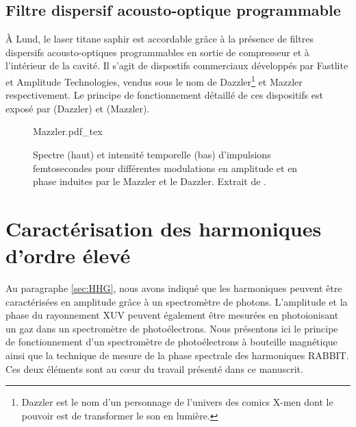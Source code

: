 \subsection{Filtre dispersif acousto-optique programmable}
\`{A} Lund, le laser titane saphir est accordable grâce à la présence de filtres dispersifs acousto-optiques programmables en sortie de compresseur et à l'intérieur de la cavité. Il s'agit de dispostifs commerciaux développés par Fastlite et Amplitude Technologies, vendus sous le nom de Dazzler\footnote{Dazzler est le nom d'un personnage de l'univers des comics X-men dont le pouvoir est de transformer le son en lumière.} et Mazzler respectivement. Le principe de fonctionnement détaillé de ces dispositifs est exposé par  (Dazzler) et
 (Mazzler).

\begin{figure}
\centering
\def\svgwidth{0.5\columnwidth}
{Mazzler.pdf_tex}
\caption{Spectre (haut) et intensité temporelle (bas) d'impulsions femtosecondes pour différentes modulations en amplitude et en phase induites par le Mazzler et le Dazzler. Extrait de .}
\label{fig:Mazzler}
\end{figure}


\section{Caractérisation des harmoniques d'ordre élevé}
\label{sec:CaracHHG}
Au paragraphe \ref{sec:HHG}, nous avons indiqué que les harmoniques peuvent être caractérisées en amplitude grâce à un spectromètre de photons. L'amplitude et la phase du rayonnement XUV peuvent également être mesurées en photoionisant un gaz dans un spectromètre de photoélectrons. Nous présentons ici le principe de fonctionnement d'un spectromètre de photoélectrons à bouteille magnétique ainsi que la technique de mesure de la phase spectrale des harmoniques RABBIT. Ces deux éléments sont au c\oe ur du travail présenté dans ce manuscrit.

